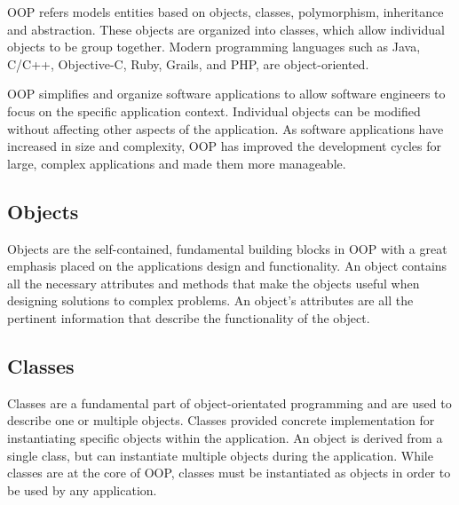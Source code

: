 \documentclass[journal]{IEEEtran}
\begin{document}

OOP refers %
models entities based on objects, classes, polymorphism, inheritance and abstraction.  These objects are organized into classes, which allow individual objects to be group together. Modern programming languages such as Java, C/C++, Objective-C, Ruby, Grails, and PHP, are object-oriented. 


OOP simplifies and organize software applications to allow software engineers to focus on the specific application context. Individual objects can be modified without affecting other aspects of the application. As software applications have increased in size and complexity, OOP has improved the development cycles for large, complex applications
and made them more manageable.


\subsection{Objects}
Objects are the self-contained, fundamental building blocks in OOP with a great emphasis placed on the applications design and functionality.  An object contains all the necessary attributes and methods that make the objects useful when designing solutions to complex problems.  An object's attributes are all the pertinent information that describe the functionality of the object.  


\subsection{Classes}
Classes are a fundamental part of object-orientated programming and are used to describe one or multiple objects.  Classes provided concrete implementation for instantiating specific objects within the application.  An object is derived from a single class, but can instantiate multiple objects during the application.  While classes are at the core of OOP, classes must be instantiated as objects in order to be used by any application. 
\end{document}
